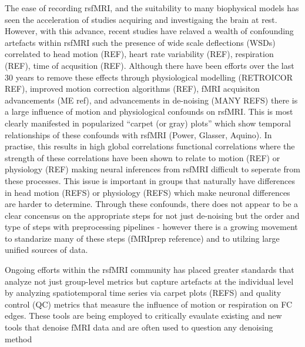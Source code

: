 \documentclass[oneside]{zHenriquesLab-StyleBioRxiv}
\begin{document}

The ease of recording rsfMRI, and the suitability to many biophysical models has seen the acceleration of studies acquiring and investigaing the brain at rest. However, with this advance, recent studies have relaved a wealth of confounding artefacts within rsfMRI such the presence of wide scale deflections (WSDs) correlated to head motion (REF), heart rate variability (REF), respiration (REF), time of acqusition (REF). Although there have been efforts over the last 30 years to remove these effects through physiological modelling (RETROICOR REF), improved motion correction algorithms (REF), fMRI acquisiton advancements (ME ref), and advancements in de-noising (MANY REFS) there is a large influence of motion and physiological confounds on rsfMRI. This is most clearly manifested in popularized ``carpet (or gray) plots'' which show temporal relationships of these confounds with rsfMRI (Power, Glasser, Aquino). In practise, this results in high global correlations functional correlations where the strength of these correlations have been shown to relate to motion (REF) or physiology (REF) making neural inferences from rsfMRI difficult to seperate from these processes. This issue is important in groups that naturally have differences in head motion (REFS) or physiology (REFS) which make neuronal differences are harder to determine. Through these confounds, there does not appear to be a clear concensus on the appropriate steps for not just de-noising but the order and type of steps with preprocessing pipelines - however there is a growing movement to standarize many of these steps (fMRIprep reference) and to utilzing large unified sources of data.


Ongoing efforts within the rsfMRI community has placed greater standards that analyze not just group-level metrics but capture artefacts at the individual level by analyzing spatiotemporal time series via carpet plots (REFS) and quality control (QC) metrics that measure the influence of motion or respiration on FC edges. These tools are being employed to critically evaulate existing and new tools that denoise fMRI data and are often used to question any denoising method \cite{ciric2017benchmarking,Parkes:2018dz} 
\end{document}
